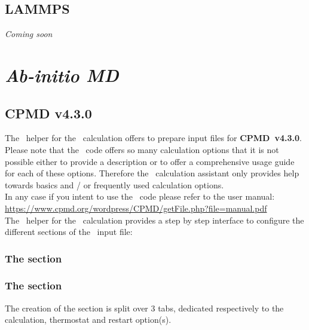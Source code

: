 \newpage
\subsection{LAMMPS}

{\em{Coming soon}}

\newpage

\section{{\em{Ab-initio MD}}}

\subsection{CPMD v4.3.0}

The \atomes\ helper for the \cpmd\ calculation offers to prepare input files for {\bf{CPMD~v4.3.0}}. 
Please note that the \cpmd\ code offers so many calculation options that it is not possible either to provide a description 
or to offer a comprehensive usage guide for each of these options.  
Therefore the \cpmd\ calculation assistant only provides help towards basics and / or frequently used calculation options. \\[0.25cm]
In any case if you intent to use the \cpmd\ code please refer to the user manual: \\[0.25cm]
\href{https://www.cpmd.org/wordpress/CPMD/getFile.php?file=manual.pdf}{https://www.cpmd.org/wordpress/CPMD/getFile.php?file=manual.pdf}\\[0.25cm]
The \atomes\ helper for the \cpmd\ calculation provides a step by step interface to configure the different sections of the \cpmd\ input file:

\subsubsection*{The  section}


\newpage

\subsubsection*{The  section}

The creation of the  section is split over 3 tabs, dedicated respectively to the calculation, thermostat and restart option(s). 


